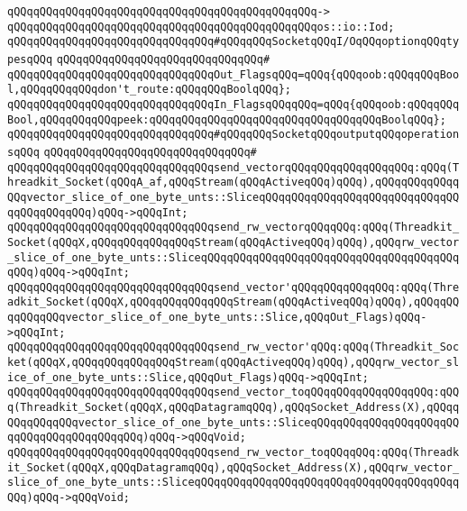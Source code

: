 \verb|qQQqqQQqqQQqqQQqqQQqqQQqqQQqqQQqqQQqqQQqqQQqqQQq->|\newline
\verb|qQQqqQQqqQQqqQQqqQQqqQQqqQQqqQQqqQQqqQQqqQQqqQQqos::io::Iod;|\newline
\newline
\verb|qQQqqQQqqQQqqQQqqQQqqQQqqQQqqQQq#qQQqqQQqSocketqQQqI/OqQQqoptionqQQqtypesqQQq|\newline
\verb|qQQqqQQqqQQqqQQqqQQqqQQqqQQqqQQq#|\newline
\verb|qQQqqQQqqQQqqQQqqQQqqQQqqQQqqQQqOut_FlagsqQQq=qQQq{qQQqoob:qQQqqQQqBool,qQQqqQQqqQQqdon't_route:qQQqqQQqBoolqQQq};|\newline
\verb|qQQqqQQqqQQqqQQqqQQqqQQqqQQqqQQqIn_FlagsqQQqqQQq=qQQq{qQQqoob:qQQqqQQqBool,qQQqqQQqqQQqpeek:qQQqqQQqqQQqqQQqqQQqqQQqqQQqqQQqqQQqBoolqQQq};|\newline
\newline
\verb|qQQqqQQqqQQqqQQqqQQqqQQqqQQqqQQq#qQQqqQQqSocketqQQqoutputqQQqoperationsqQQq|\newline
\verb|qQQqqQQqqQQqqQQqqQQqqQQqqQQqqQQq#|\newline
\verb|qQQqqQQqqQQqqQQqqQQqqQQqqQQqqQQqsend_vectorqQQqqQQqqQQqqQQqqQQq:qQQq(Threadkit_Socket(qQQqA_af,qQQqStream(qQQqActiveqQQq)qQQq),qQQqqQQqqQQqqQQqvector_slice_of_one_byte_unts::SliceqQQqqQQqqQQqqQQqqQQqqQQqqQQqqQQqqQQqqQQqqQQq)qQQq->qQQqInt;|\newline
\verb|qQQqqQQqqQQqqQQqqQQqqQQqqQQqqQQqsend_rw_vectorqQQqqQQq:qQQq(Threadkit_Socket(qQQqX,qQQqqQQqqQQqqQQqStream(qQQqActiveqQQq)qQQq),qQQqrw_vector_slice_of_one_byte_unts::SliceqQQqqQQqqQQqqQQqqQQqqQQqqQQqqQQqqQQqqQQqqQQq)qQQq->qQQqInt;|\newline
\verb|qQQqqQQqqQQqqQQqqQQqqQQqqQQqqQQqsend_vector'qQQqqQQqqQQqqQQq:qQQq(Threadkit_Socket(qQQqX,qQQqqQQqqQQqqQQqStream(qQQqActiveqQQq)qQQq),qQQqqQQqqQQqqQQqvector_slice_of_one_byte_unts::Slice,qQQqOut_Flags)qQQq->qQQqInt;|\newline
\verb|qQQqqQQqqQQqqQQqqQQqqQQqqQQqqQQqsend_rw_vector'qQQq:qQQq(Threadkit_Socket(qQQqX,qQQqqQQqqQQqqQQqStream(qQQqActiveqQQq)qQQq),qQQqrw_vector_slice_of_one_byte_unts::Slice,qQQqOut_Flags)qQQq->qQQqInt;|\newline
\newline
\verb|qQQqqQQqqQQqqQQqqQQqqQQqqQQqqQQqsend_vector_toqQQqqQQqqQQqqQQqqQQq:qQQq(Threadkit_Socket(qQQqX,qQQqDatagramqQQq),qQQqSocket_Address(X),qQQqqQQqqQQqqQQqvector_slice_of_one_byte_unts::SliceqQQqqQQqqQQqqQQqqQQqqQQqqQQqqQQqqQQqqQQqqQQq)qQQq->qQQqVoid;|\newline
\verb|qQQqqQQqqQQqqQQqqQQqqQQqqQQqqQQqsend_rw_vector_toqQQqqQQq:qQQq(Threadkit_Socket(qQQqX,qQQqDatagramqQQq),qQQqSocket_Address(X),qQQqrw_vector_slice_of_one_byte_unts::SliceqQQqqQQqqQQqqQQqqQQqqQQqqQQqqQQqqQQqqQQqqQQq)qQQq->qQQqVoid;|\newline
